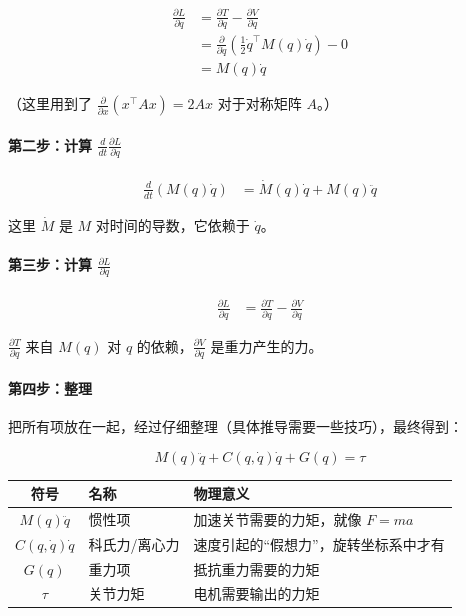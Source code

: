 \begin{align}
\frac{\partial L}{\partial \dot{q}} &= \frac{\partial T}{\partial \dot{q}} - \frac{\partial V}{\partial \dot{q}} \\
&= \frac{\partial}{\partial \dot{q}} \left( \frac{1}{2} \dot{q}^\top M(q) \dot{q} \right) - 0 \\
&= M(q) \dot{q}
\end{align}

（这里用到了 $\frac{\partial}{\partial x}(x^\top A x) = 2Ax$ 对于对称矩阵 $A$。）

\paragraph{第二步：计算 $\frac{d}{dt}\frac{\partial L}{\partial \dot{q}}$}

\begin{align}
\frac{d}{dt}(M(q)\dot{q}) &= \dot{M}(q)\dot{q} + M(q)\ddot{q}
\end{align}

这里 $\dot{M}$ 是 $M$ 对时间的导数，它依赖于 $\dot{q}$。

\paragraph{第三步：计算 $\frac{\partial L}{\partial q}$}

\begin{align}
\frac{\partial L}{\partial q} &= \frac{\partial T}{\partial q} - \frac{\partial V}{\partial q}
\end{align}

$\frac{\partial T}{\partial q}$ 来自 $M(q)$ 对 $q$ 的依赖，$\frac{\partial V}{\partial q}$ 是重力产生的力。

\paragraph{第四步：整理}

把所有项放在一起，经过仔细整理（具体推导需要一些技巧），最终得到：

\begin{keyformula}[title=机器人动力学标准形式]
\begin{equation}
\boxed{M(q)\ddot{q} + C(q, \dot{q})\dot{q} + G(q) = \tau}
\end{equation}
\end{keyformula}

\begin{center}
\renewcommand{\arraystretch}{1.5}
\begin{tabular}{c|l|p{7cm}}
\toprule
\textbf{符号} & \textbf{名称} & \textbf{物理意义} \\
\midrule
$M(q)\ddot{q}$ & 惯性项 & 加速关节需要的力矩，就像 $F = ma$ \\
$C(q, \dot{q})\dot{q}$ & 科氏力/离心力 & 速度引起的“假想力”，旋转坐标系中才有 \\
$G(q)$ & 重力项 & 抵抗重力需要的力矩 \\
$\tau$ & 关节力矩 & 电机需要输出的力矩 \\
\bottomrule
\end{tabular}
\end{center}

